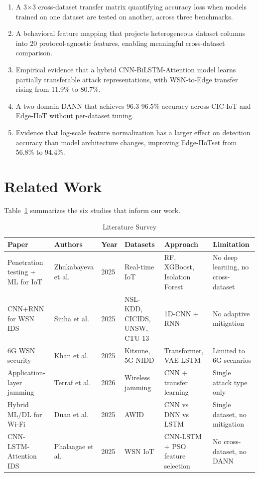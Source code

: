 \documentclass[conference]{IEEEtran}
\begin{document}
\begin{enumerate}
\item A 3$\times$3 cross-dataset transfer matrix quantifying accuracy loss when models trained on one dataset are tested on another, across three benchmarks.
\item A behavioral feature mapping that projects heterogeneous dataset columns into 20 protocol-agnostic features, enabling meaningful cross-dataset comparison.
\item Empirical evidence that a hybrid CNN-BiLSTM-Attention model learns partially transferable attack representations, with WSN-to-Edge transfer rising from 11.9\% to 80.7\%.
\item A two-domain DANN that achieves 96.3-96.5\% accuracy across CIC-IoT and Edge-IIoT without per-dataset tuning.
\item Evidence that log-scale feature normalization has a larger effect on detection accuracy than model architecture changes, improving Edge-IIoTset from 56.8\% to 94.4\%.
\end{enumerate}

\section{Related Work}

Table~\ref{tab:literature} summarizes the six studies that inform our work.

\begin{table}[t]
\centering
\caption{Literature Survey}
\label{tab:literature}
\small
\begin{tabular}{p{5cm}p{2.5cm}p{1cm}p{2.5cm}p{2.5cm}p{2.5cm}}
\toprule
\textbf{Paper} & \textbf{Authors} & \textbf{Year} & \textbf{Datasets} & \textbf{Approach} & \textbf{Limitation} \\
\midrule
Penetration testing + ML for IoT & Zhukabayeva et al. & 2025 & Real-time IoT & RF, XGBoost, Isolation Forest & No deep learning, no cross-dataset \\
CNN+RNN for WSN IDS & Sinha et al. & 2025 & NSL-KDD, CICIDS, UNSW, CTU-13 & 1D-CNN + RNN & No adaptive mitigation \\
6G WSN security & Khan et al. & 2025 & Kitsune, 5G-NIDD & Transformer, VAE-LSTM & Limited to 6G scenarios \\
Application-layer jamming & Terraf et al. & 2026 & Wireless jamming & CNN + transfer learning & Single attack type only \\
Hybrid ML/DL for Wi-Fi & Duan et al. & 2025 & AWID & CNN vs DNN vs LSTM & Single dataset, no mitigation \\
CNN-LSTM-Attention IDS & Phalaagae et al. & 2025 & WSN IoT & CNN-LSTM + PSO feature selection & No cross-dataset, no DANN \\
\bottomrule
\end{tabular}
\end{table}
\end{document}
